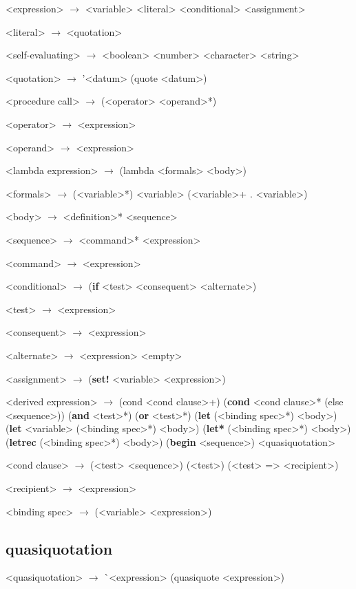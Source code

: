 \documentclass[11pt]{report}
\begin{document}
\begin{grammar}
  <expression> $\longrightarrow$ <variable>
  \alt <literal>
  \alt <conditional>
  \alt <assignment>

  <literal> $\longrightarrow$ <quotation> 

  <self-evaluating> $\longrightarrow$ <boolean> \alt <number>
  \alt <character> \alt <string>

  <quotation> $\longrightarrow$ '<datum> \alt (quote <datum>)

  <procedure call> $\longrightarrow$ (<operator> <operand>*)
  
  <operator> $\longrightarrow$ <expression>
  
  <operand> $\longrightarrow$ <expression>

  <lambda expression> $\longrightarrow$ (lambda <formals> <body>)

  <formals> $\longrightarrow$ (<variable>*) \alt <variable>
  \alt (<variable>+  .  <variable>)

  <body> $\longrightarrow$ <definition>* <sequence>

  <sequence> $\longrightarrow$ <command>* <expression>

  <command> $\longrightarrow$ <expression>

  <conditional> $\longrightarrow$ (\textbf{if} <test> <consequent> <alternate>)

  <test> $\longrightarrow$ <expression>

  <consequent> $\longrightarrow$ <expression>

  <alternate> $\longrightarrow$ <expression> \alt <empty>

  <assignment> $\longrightarrow$ (\textbf{set!} <variable> <expression>)

  <derived expression> $\longrightarrow$ (cond <cond clause>+)
  \alt (\textbf{cond} <cond clause>* (else <sequence>))
  \alt (\textbf{and} <test>*)
  \alt (\textbf{or} <test>*)
  \alt (\textbf{let} (<binding spec>*) <body>)
  \alt (\textbf{let} <variable> (<binding spec>*) <body>)
  \alt (\textbf{let*} (<binding spec>*) <body>)
  \alt (\textbf{letrec} (<binding spec>*) <body>)
  \alt (\textbf{begin} <sequence>)
  \alt <quasiquotation>

  <cond clause> $\longrightarrow$ (<test> <sequence>)
  \alt (<test>)
  \alt (<test> => <recipient>)

  <recipient> $\longrightarrow$ <expression>

  <binding spec> $\longrightarrow$ (<variable> <expression>)
  
\end{grammar}

\subsection{quasiquotation}
\begin{grammar}
  <quasiquotation> $\longrightarrow$ \`{}<expression>
  \alt (quasiquote <expression>)
\end{grammar}
\end{document}
